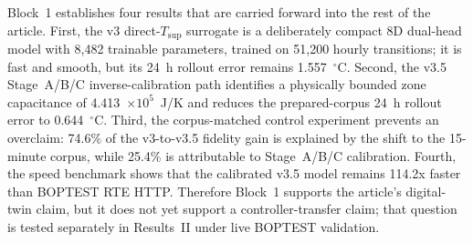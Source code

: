 \documentclass[11pt,a4paper]{article}
\newcommand{\Tsupply}{\ensuremath{T_{\mathrm{sup}}}}
\begin{document}
Block~1 establishes four results that are carried forward into the rest of the article. First, the v3 direct-\Tsupply{} surrogate is a deliberately compact 8D dual-head model with 8,482 trainable parameters, trained on 51,200 hourly transitions; it is fast and smooth, but its 24~h rollout error remains 1.557~$^\circ$C. Second, the v3.5 Stage~A/B/C inverse-calibration path identifies a physically bounded zone capacitance of 4.413~$\times10^5$~J/K and reduces the prepared-corpus 24~h rollout error to 0.644~$^\circ$C. Third, the corpus-matched control experiment prevents an overclaim: 74.6\% of the v3-to-v3.5 fidelity gain is explained by the shift to the 15-minute corpus, while 25.4\% is attributable to Stage~A/B/C calibration. Fourth, the speed benchmark shows that the calibrated v3.5 model remains 114.2x faster than BOPTEST RTE HTTP. Therefore Block~1 supports the article's digital-twin claim, but it does not yet support a controller-transfer claim; that question is tested separately in Results~II under live BOPTEST validation.

\FloatBarrier
\end{document}
